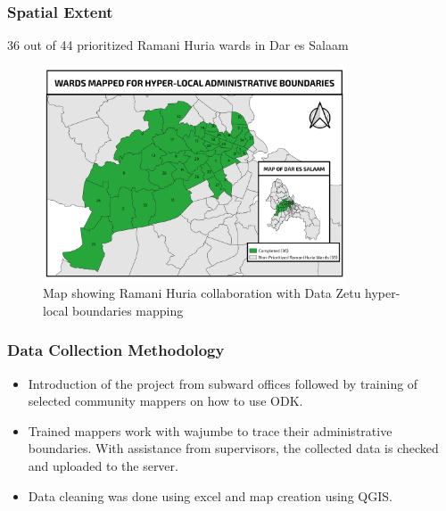 \documentclass[a4paper,12pt,twoside]{article}
\begin{document}
\subsubsection{Spatial Extent}
36 out of 44 prioritized Ramani Huria wards in Dar es Salaam
\begin{figure}[h]
  \color{RHgreen}\caption{Map showing Ramani Huria collaboration with Data Zetu hyper-local boundaries mapping}
  \centering
  \includegraphics[width=0.8\textwidth]{images/hyperlocal_boundary.png}
\end{figure}



\subsubsection{Data Collection Methodology}
\begin{itemize}
    \item Introduction of the project from subward offices followed by training of selected community mappers on how to use ODK.
    \item Trained mappers work with wajumbe to trace their administrative boundaries. With assistance from supervisors, the collected data is checked and uploaded to the server. 
    \item Data cleaning was done using excel  and map creation using QGIS.
\end{itemize}

\medskip
\end{document}
